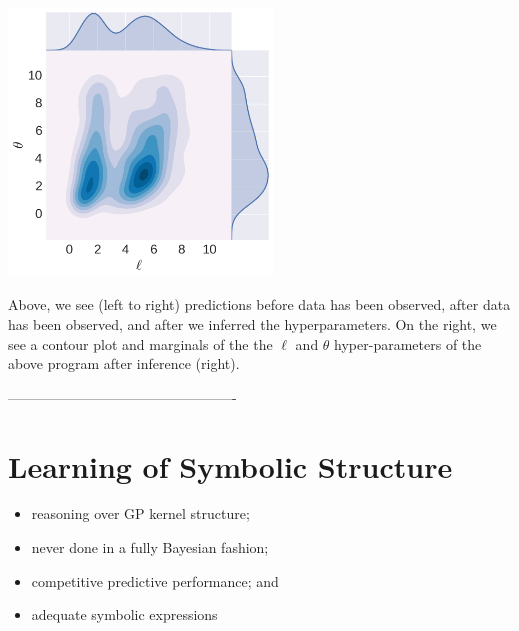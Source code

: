 \documentclass[a0,portrait]{a0poster}
\begin{document}
\begin{multicols}{2}
\begin{table} %
\begin{center}
\includegraphics[width=7cm]{neal_contour_l_vs_sf_s__marginal_after.png} 
\end{center}
\end{table}
 Above, we see (left to right) predictions before data has been observed, after data has been observed, and after we inferred the hyperparameters. On the right, we see a contour plot and marginals of the the $\ell$ and $\theta$ hyper-parameters of the above program after inference (right).

-------------------------------------------------


\section*{Learning of Symbolic Structure}
\begin{itemize}
\setlength{\itemindent}{1cm}
 \item reasoning over GP kernel structure;
 \item never done in a fully Bayesian fashion;
 \item competitive predictive performance; and
 \item adequate symbolic expressions
 \end{itemize}

\end{multicols}
\end{document}
